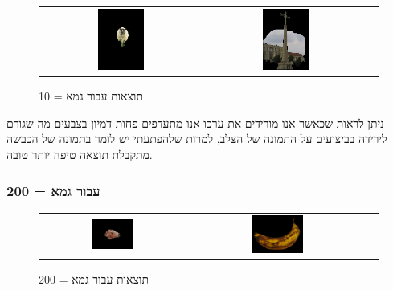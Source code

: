 \documentclass[a4paper,12pt]{article}
\begin{document}
\begin{figure}[H]
\centering
\begin{tabular}{ccc}
\includegraphics[width=0.3\textwidth]{my_reasults/gamma10/sheep_result.png} &
\includegraphics[width=0.3\textwidth]{my_reasults/gamma10/cross_result.png} \\
\end{tabular}
\caption{תוצאות עבור גמא = 10}
\end{figure}

ניתן לראות שכאשר אנו מורידים את ערכו אנו מתעדפים פחות דמיון בצבעים מה שגורם לירידה בביצועים על התמונה של הצלב, למרות שלהפתעתי יש לומר בתמונה של הכבשה מתקבלת תוצאה טיפה יותר טובה.

\subsubsection*{עבור גמא = 200
}

\begin{figure}[H]
\centering
\begin{tabular}{ccc}
\includegraphics[width=0.3\textwidth]{my_reasults/gamma200/llama_result.png} &
\includegraphics[width=0.3\textwidth]{my_reasults/gamma200/banana1_result.png} \\
\end{tabular}
\caption{תוצאות עבור גמא = 200}
\end{figure}
\end{document}
